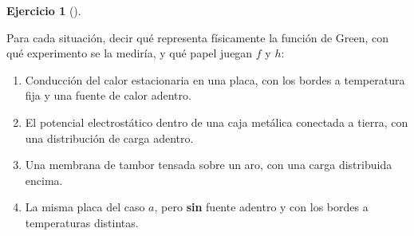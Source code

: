 \documentclass[
  spanish,
  a4paper,
]{scrbook}
\providecommand{\tightlist}{%
  \setlength{\itemsep}{0pt}\setlength{\parskip}{0pt}}
\theoremstyle{definition}
\theoremstyle{plain}
\theoremstyle{definition}
\theoremstyle{plain}
\theoremstyle{definition}
\newtheorem{exercise}{Ejercicio}[chapter]
\theoremstyle{remark}
\begin{document}
\begin{exercise}[]\protect\hypertarget{exr-green-fisico}{}\label{exr-green-fisico}

Para cada situación, decir qué representa físicamente la función de
Green, con qué experimento se la mediría, y qué papel juegan \(f\) y
\(h\):

\begin{enumerate}
\def\labelenumi{\alph{enumi}.}
\tightlist
\item
  Conducción del calor estacionaria en una placa, con los bordes a
  temperatura fija y una fuente de calor adentro.
\item
  El potencial electrostático dentro de una caja metálica conectada a
  tierra, con una distribución de carga adentro.
\item
  Una membrana de tambor tensada sobre un aro, con una carga distribuida
  encima.
\item
  La misma placa del caso \(a\), pero \textbf{sin} fuente adentro y con
  los bordes a temperaturas distintas.
\end{enumerate}

\end{exercise}
\end{document}
